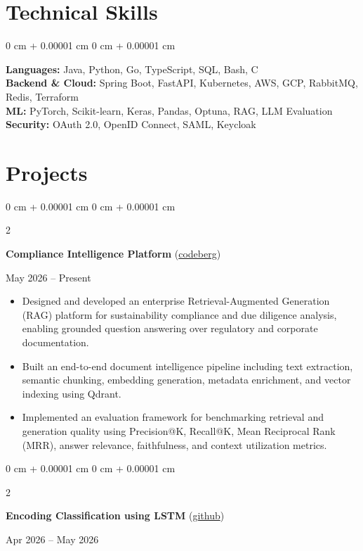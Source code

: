 \documentclass[10pt, letterpaper]{article}
\newenvironment{highlights}{
    \begin{itemize}[
        topsep=0.10 cm,
        parsep=0.10 cm,
        partopsep=0pt,
        itemsep=0pt,
        leftmargin=0 cm + 10pt
    ]
}{
    \end{itemize}
} %
\newenvironment{onecolentry}{
    \begin{adjustwidth}{
        0 cm + 0.00001 cm
    }{
        0 cm + 0.00001 cm
    }
}{
    \end{adjustwidth}
} %
\newenvironment{twocolentry}[2][]{
    \onecolentry
    \def\secondColumn{#2}
    \setcolumnwidth{\fill, 4.5 cm}
    \begin{paracol}{2}
}{
    \switchcolumn \raggedleft \secondColumn
    \end{paracol}
    \endonecolentry
} %
\begin{document}
\section{Technical Skills}
\begin{onecolentry}
    \textbf{Languages:} Java, Python, Go, TypeScript, SQL, Bash, C \\
    \textbf{Backend \& Cloud:} Spring Boot, FastAPI, Kubernetes, AWS, GCP, RabbitMQ, Redis, Terraform \\
    \textbf{ML:} PyTorch, Scikit-learn, Keras, Pandas, Optuna, RAG, LLM Evaluation \\
    \textbf{Security:} OAuth 2.0, OpenID Connect, SAML, Keycloak
\end{onecolentry}


\section{Projects}

\vspace{0.1 cm}
\begin{twocolentry}{
        May 2026 – Present
    }
    \textbf{Compliance Intelligence Platform} (\href{https://codeberg.org/Compliance-Intelligence-Platform}{codeberg})
\end{twocolentry}

\begin{highlights}
    \item Designed and developed an enterprise Retrieval-Augmented Generation (RAG) platform for sustainability compliance and due diligence analysis, enabling grounded question answering over regulatory and corporate documentation.

    \item Built an end-to-end document intelligence pipeline including text extraction, semantic chunking, embedding generation, metadata enrichment, and vector indexing using Qdrant.

    \item Implemented an evaluation framework for benchmarking retrieval and generation quality using Precision@K, Recall@K, Mean Reciprocal Rank (MRR), answer relevance, faithfulness, and context utilization metrics.
\end{highlights}

\begin{twocolentry}{
        Apr 2026 – May 2026
    }
    \textbf{Encoding Classification using LSTM} (\href{https://github.com/FlavRomano/encoding-classifier-lstm}{github})
\end{twocolentry}
\end{document}
